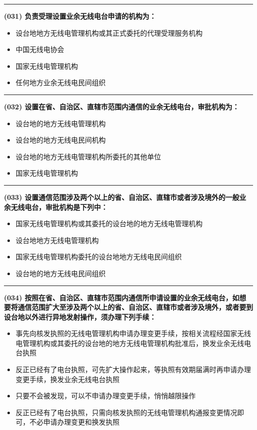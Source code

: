 \documentclass[twocolumn]{ctexart}  %
\begin{document}
\noindent\rule{0.5\textwidth}{1pt}
\heiti \textbf{(031) 负责受理设置业余无线电台申请的机构为：} \songti {\color{gray} [LK0030] }
\begin{itemize}
	\item  设台地地方无线电管理机构或其正式委托的代理受理服务机构
	\item  中国无线电协会
	\item  国家无线电管理机构
	\item  任何地方业余无线电民间组织
\end{itemize}


\noindent\rule{0.5\textwidth}{1pt}
\heiti \textbf{(032) 设置在省、自治区、直辖市范围内通信的业余无线电台，审批机构为：} \songti {\color{gray} [LK0031] }
\begin{itemize}
	\item  设台地的地方无线电管理机构
	\item  设台地的地方无线电民间机构
	\item  设台地的地方无线电管理机构所委托的其他单位
	\item  国家无线电管理机构
\end{itemize}


\noindent\rule{0.5\textwidth}{1pt}
\heiti \textbf{(033) 设置通信范围涉及两个以上的省、自治区、直辖市或者涉及境外的一般业余无线电台，审批机构是下列中：} \songti {\color{gray} [LK0032] }
\begin{itemize}
	\item  国家无线电管理机构或其委托的设台地的地方无线电管理机构
	\item  设台地地方无线电管理机构
	\item  国家无线电管理机构委托的设台地地方无线电民间组织
	\item  设台地的地方无线电民间组织
\end{itemize}


\noindent\rule{0.5\textwidth}{1pt}
\heiti \textbf{(034) 按照在省、自治区、直辖市范围内通信所申请设置的业余无线电台，如想要将通信范围扩大至涉及两个以上的省、自治区、直辖市或者涉及境外，或者要到设台地以外进行异地发射操作，须办理下列手续：} \songti {\color{gray} [LK0033] }
\begin{itemize}
	\item  事先向核发执照的无线电管理机构申请办理变更手续，按相关流程经国家无线电管理机构或其委托的设台地的地方无线电管理机构批准后，换发业余无线电台执照
	\item  反正已经有了电台执照，可先扩大操作起来，等执照有效期届满时再申请办理变更手续，换发业余无线电台执照
	\item  只要不会被发现，可以不申请办理变更手续，悄悄越限操作
	\item  反正已经有了电台执照，只需向核发执照的无线电管理机构通报变更情况即可，不必申请办理变更和换发执照
\end{itemize}
\end{document}
